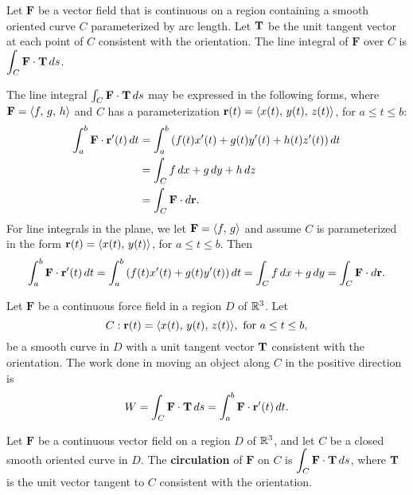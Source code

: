 \documentclass[mathNotesPreamble]{subfiles}
\begin{document}
  \begin{defn*}
    Let $\mathbf F$ be a vector field that is continuous on a region containing a smooth oriented curve $C$ parameterized by arc length. Let ${\mathbf{T}}$ be the unit tangent vector at each point of $C$ consistent with the orientation. The line integral of $\mathbf F$ over $C$ is $\displaystyle\int_C \mathbf F\cdot{\mathbf{T}}\,ds$.
  \end{defn*}

  \begin{thmBox*}
    The line integral $\int_C \mathbf F\cdot{\mathbf{T}}\,ds$ may be expressed in the following forms, where $\mathbf F={\left\langle f,\,g,\,h \right\rangle}$ and $C$ has a parameterization ${\mathbf{r}}(t)={\left\langle x(t),\,y(t),\,z(t) \right\rangle}$, for $a\leq t\leq b$:
    \begin{align*}
      \int_a^b \mathbf F\cdot{\mathbf{r}}'(t)\,dt &=\int_a^b {\left(f(t)x'(t)+g(t)y'(t)+h(t)z'(t)\right)}\,dt\\
        &=\int_C f\,dx+g\,dy+h\,dz\\
        &=\int_C \mathbf F\cdot d{\mathbf{r}}.
    \end{align*}
    For line integrals in the plane, we let $\mathbf F={\left\langle f,\,g \right\rangle}$ and assume $C$ is parameterized in the form ${\mathbf{r}}(t)={\left\langle x(t),\,y(t) \right\rangle}$, for $a\leq t\leq b$. Then
      \[\int_a^b \mathbf F\cdot {\mathbf{r}}'(t)\,dt=\int_a^b {\left(f(t)x'(t)+g(t)y'(t)\right)}\,dt= \int_C f\,dx+g\,dy=\int_C \mathbf F\cdot d{\mathbf{r}}.\]
  \end{thmBox*}

  \begin{defn*}
    Let $\mathbf F$ be a continuous force field in a region $D$ of $\mathbb{R}^3$. Let
      \[C: {\mathbf{r}}(t)={\left\langle x(t),\,y(t),\,z(t) \right\rangle}, \textnormal{ for } a\leq t\leq b,\]
    be a smooth curve in $D$ with a unit tangent vector ${\mathbf{T}}$ consistent with the orientation. The work done in moving an object along $C$ in the positive direction is
      \[W=\int_C \mathbf F\cdot{\mathbf{T}}\,ds=\int_a^b \mathbf F\cdot{\mathbf{r}}'(t)\,dt.\]
  \end{defn*}

  \begin{defn*}[Circulation]
    Let $\mathbf F$ be a continuous vector field on a region $D$ of $\mathbb{R}^3$, and let $C$ be a closed smooth oriented curve in $D$. The \textbf{circulation} of $\mathbf F$ on $C$ is $\displaystyle\int_C \mathbf F\cdot{\mathbf{T}}\,ds$, where ${\mathbf{T}}$ is the unit vector tangent to $C$ consistent with the orientation. 
  \end{defn*}
\end{document}
